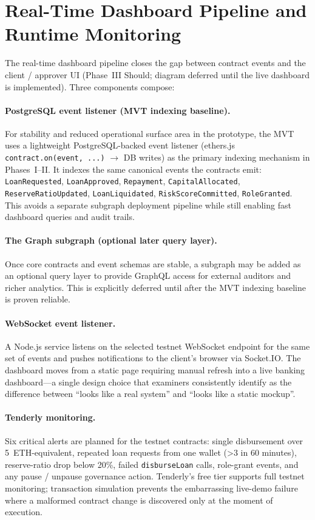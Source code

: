 \documentclass[12pt,a4paper]{report}
\begin{document}
\section{Real-Time Dashboard Pipeline and Runtime Monitoring}
\label{sec:realtime}

The real-time dashboard pipeline closes the gap between contract events and the client / approver UI (Phase~III Should; diagram deferred until the live dashboard is implemented). Three components compose:

\paragraph{PostgreSQL event listener (MVT indexing baseline).}
For stability and reduced operational surface area in the prototype, the MVT uses a lightweight PostgreSQL-backed event listener (ethers.js \texttt{contract.on(event, ...)} $\to$ DB writes) as the primary indexing mechanism in Phases~I--II. It indexes the same canonical events the contracts emit: \texttt{LoanRequested}, \texttt{LoanApproved}, \texttt{Repayment}, \texttt{CapitalAllocated}, \texttt{ReserveRatioUpdated}, \texttt{LoanLiquidated}, \texttt{RiskScoreCommitted}, \texttt{RoleGranted}. This avoids a separate subgraph deployment pipeline while still enabling fast dashboard queries and audit trails.

\paragraph{The Graph subgraph (optional later query layer).}
Once core contracts and event schemas are stable, a subgraph may be added as an optional query layer to provide GraphQL access for external auditors and richer analytics. This is explicitly deferred until after the MVT indexing baseline is proven reliable.

\paragraph{WebSocket event listener.}
A Node.js service listens on the selected testnet WebSocket endpoint for the same set of events and pushes notifications to the client's browser via Socket.IO. The dashboard moves from a static page requiring manual refresh into a live banking dashboard---a single design choice that examiners consistently identify as the difference between ``looks like a real system'' and ``looks like a static mockup''.

\paragraph{Tenderly monitoring.}
Six critical alerts are planned for the testnet contracts: single disbursement over 5~ETH-equivalent, repeated loan requests from one wallet (>3 in 60 minutes), reserve-ratio drop below 20\%, failed \texttt{disburseLoan} calls, role-grant events, and any pause / unpause governance action. Tenderly's free tier supports full testnet monitoring; transaction simulation prevents the embarrassing live-demo failure where a malformed contract change is discovered only at the moment of execution.
\end{document}
